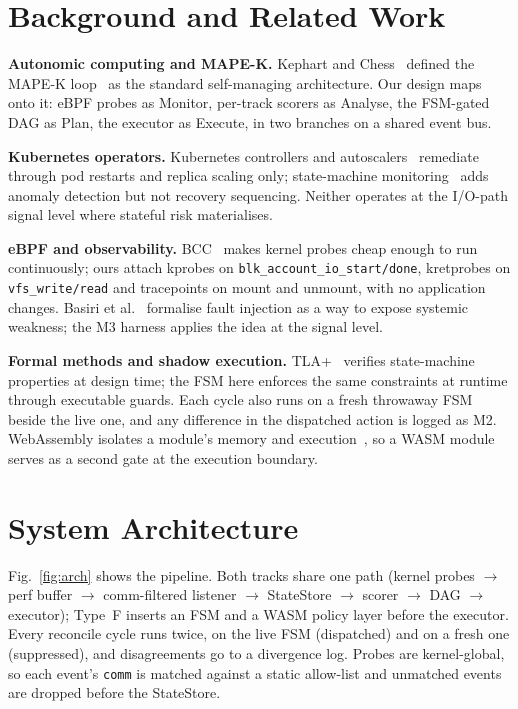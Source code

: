 \documentclass[conference]{IEEEtran}
\begin{document}
\section{Background and Related Work}
\label{sec:background}

\textbf{Autonomic computing and MAPE-K.} Kephart and Chess~\cite{b8} defined the MAPE-K loop~\cite{b7} as the standard self-managing architecture. Our design maps onto it: eBPF probes as Monitor, per-track scorers as Analyse, the FSM-gated DAG as Plan, the executor as Execute, in two branches on a shared event bus.

\textbf{Kubernetes operators.} Kubernetes controllers and autoscalers~\cite{b1} remediate through pod restarts and replica scaling only; state-machine monitoring~\cite{b10} adds anomaly detection but not recovery sequencing. Neither operates at the I/O-path signal level where stateful risk materialises.

\textbf{eBPF and observability.} BCC~\cite{b6} makes kernel probes cheap enough to run continuously; ours attach kprobes on \texttt{blk\_account\_io\_start/\allowbreak done}, kretprobes on \texttt{vfs\_write/\allowbreak read} and tracepoints on mount and unmount, with no application changes. Basiri et al.~\cite{b3} formalise fault injection as a way to expose systemic weakness; the M3 harness applies the idea at the signal level.

\textbf{Formal methods and shadow execution.} TLA+~\cite{b9} verifies state-machine properties at design time; the FSM here enforces the same constraints at runtime through executable guards. Each cycle also runs on a fresh throwaway FSM beside the live one, and any difference in the dispatched action is logged as M2. WebAssembly isolates a module's memory and execution~\cite{b11}, so a WASM module~\cite{b4} serves as a second gate at the execution boundary.

\section{System Architecture}
\label{sec:arch}

Fig.~\ref{fig:arch} shows the pipeline. Both tracks share one path (kernel probes $\rightarrow$ perf buffer $\rightarrow$ comm-filtered listener $\rightarrow$ StateStore $\rightarrow$ scorer $\rightarrow$ DAG $\rightarrow$ executor); Type~F inserts an FSM and a WASM policy layer before the executor. Every reconcile cycle runs twice, on the live FSM (dispatched) and on a fresh one (suppressed), and disagreements go to a divergence log. Probes are kernel-global, so each event's \texttt{comm} is matched against a static allow-list and unmatched events are dropped before the StateStore.
\end{document}
